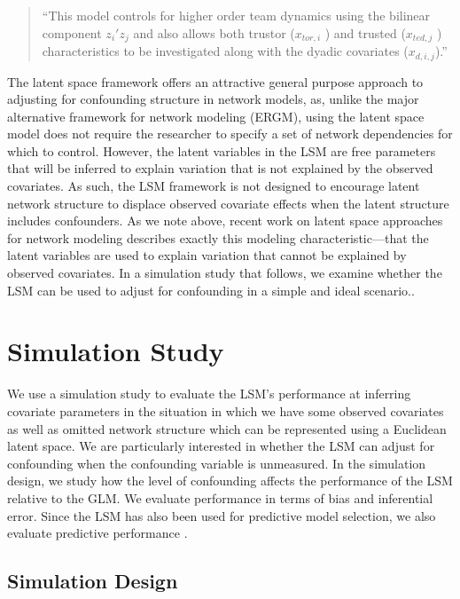 \documentclass[11pt]{article}
\begin{document}
\begin{quote}
``This model controls for higher order team dynamics using the
  bilinear component $z_i'z_j$ and also allows both trustor
  ($x_{tor,i}$ ) and trusted ($x_{ted,j}$ ) characteristics to be
  investigated along with the dyadic covariates ($x_{d,i,j}$).''
\end{quote}

The latent space framework offers an attractive general purpose
approach to adjusting for confounding structure in network models, as,
unlike the major alternative framework for network modeling (ERGM),
using the latent space model does not require the researcher to
specify a set of network dependencies for which to control.  However,
the latent variables in the LSM are free parameters that will be
inferred to explain variation that is not explained by the observed
covariates. As such, the LSM framework is not designed to encourage
latent network structure to displace observed covariate effects when
the latent structure includes confounders. As we note above, recent
work on latent space approaches for network modeling describes exactly
this modeling characteristic---that the latent variables are used to
explain variation that cannot be explained by observed covariates. In
a simulation study that follows, we examine whether the LSM can be
used to adjust for confounding in a simple and ideal scenario..

\section{Simulation Study}

We use a simulation study to evaluate the LSM's performance at
inferring covariate parameters in the situation in which we have some
observed covariates as well as omitted network structure which can be
represented using a Euclidean latent space. We are particularly
interested in whether the LSM can adjust for confounding when the
confounding variable is unmeasured. In the simulation design, we study
how the level of confounding affects the performance of the LSM
relative to the GLM. We evaluate performance in terms of bias and
inferential error. Since the LSM has also been used for predictive
model selection, we also evaluate predictive performance
\citep{ward2013gravity, fletcher2011social, fletcher2013network,
  chiu2011unifying}.

\subsection{Simulation Design}
\end{document}

